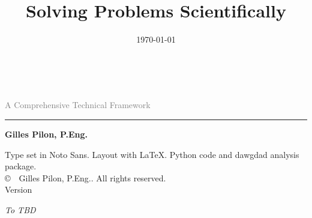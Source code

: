 \documentclass[10pt, letterpaper, twoside]{book}
\title{Solving Problems Scientifically}
\author{\authorname} %
\date{\today}
\newcommand{\authorname}{Gilles Pilon, P.Eng.}
\begin{document}
\raggedbottom

\frontmatter

\makeatletter
\renewcommand{\cleardoublepage}{\clearpage\if@twoside \ifodd\c@page\else
    \thispagestyle{plain}%
    \hbox{}\newpage\if@twocolumn\hbox{}\newpage\fi\fi\fi}
\makeatother

\thispagestyle{empty}
\begin{center}
    \vspace*{2.5in}

    \makeatletter
    {\fontsize{32pt}{38pt}\selectfont \textbf{\@title}} \\[0.5cm]
    \makeatother

    {\fontsize{14pt}{18pt}\selectfont \textcolor{gray}{A Comprehensive Technical Framework}} \\

    \vspace{1.5cm}
    \rule{\textwidth}{1.5pt}
    \vspace{2cm}

    {\fontsize{18pt}{22pt}\selectfont \textbf{\authorname}} \\

    \vfill


    \vfill
\end{center}
\newpage

\pagestyle{plain}
\thispagestyle{plain}
\vspace*{\fill}
\noindent Type set in Noto Sans. Layout with \LaTeX. Python code and dawgdad analysis package.\\
\noindent \copyright\ \the\year\ \authorname. All rights reserved.\\
\noindent Version 
\vspace*{1.5cm}
\newpage

\thispagestyle{plain}
\vspace*{2.5in}
\begin{center}
    \itshape To TBD
\end{center}
\newpage
\end{document}
